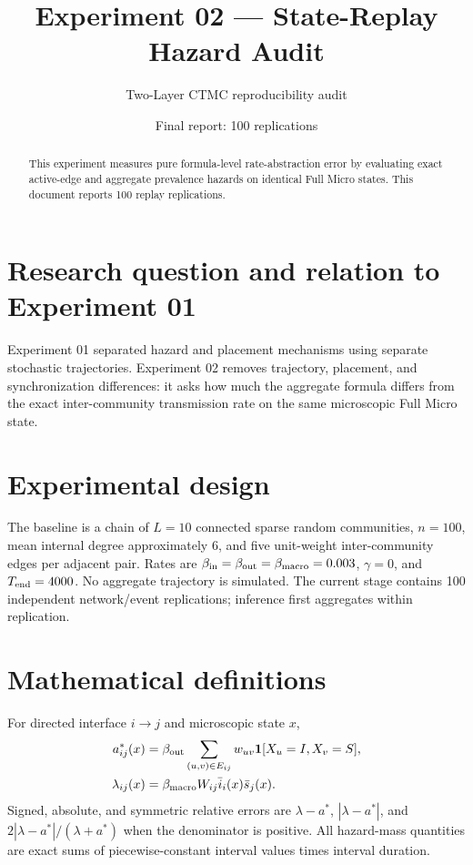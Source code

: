 \documentclass[11pt]{article}
\title{Experiment 02 --- State-Replay Hazard Audit}
\author{Two-Layer CTMC reproducibility audit}
\date{Final report: 100 replications}
\begin{document}
\maketitle
\begin{abstract}
This experiment measures pure formula-level rate-abstraction error by evaluating exact active-edge and aggregate prevalence hazards on identical Full Micro states. This document reports 100 replay replications. 
\end{abstract}

\section{Research question and relation to Experiment 01}
Experiment 01 separated hazard and placement mechanisms using separate stochastic trajectories. Experiment 02 removes trajectory, placement, and synchronization differences: it asks how much the aggregate formula differs from the exact inter-community transmission rate on the same microscopic Full Micro state.

\section{Experimental design}
The baseline is a chain of $L=10$ connected sparse random communities, $n=100$, mean internal degree approximately 6, and five unit-weight inter-community edges per adjacent pair. Rates are $\beta_{\rm in}=\beta_{\rm out}=\beta_{\rm macro}=0.003$, $\gamma=0$, and $T_{\rm end}=4000$. No aggregate trajectory is simulated. The current stage contains 100 independent network/event replications; inference first aggregates within replication.

\section{Mathematical definitions}
For directed interface $i\to j$ and microscopic state $x$,
\begin{align}
a^*_{ij}(x)&=\beta_{\rm out}\sum_{(u,v)\in E_{ij}}w_{uv}\mathbf{1}[X_u=I,X_v=S],\\
\lambda_{ij}(x)&=\beta_{\rm macro}W_{ij}\bar i_i(x)\bar s_j(x).
\end{align}
Signed, absolute, and symmetric relative errors are $\lambda-a^*$, $|\lambda-a^*|$, and $2|\lambda-a^*|/(\lambda+a^*)$ when the denominator is positive. All hazard-mass quantities are exact sums of piecewise-constant interval values times interval duration.
\end{document}
